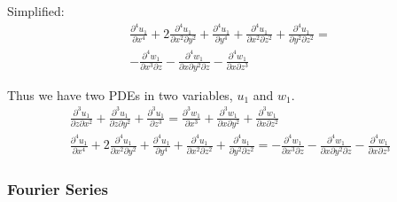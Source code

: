 \documentclass[12pt, a4paper, twoside, openright]{book}
\begin{document}
Simplified:
\begin{multline}
\frac{\partial^4 u_1}{\partial x^4} 
+ 2 \frac{\partial^4 u_1}{\partial x^2 \partial y^2} 
+ \frac{\partial^4 u_1}{\partial y^4}
+ \frac{\partial^4 u_1}{\partial x^2 \partial z^2} 
+ \frac{\partial^4 u_1}{\partial y^2 \partial z^2}
=  \\
- \frac{\partial^4 w_1}{\partial x^3 \partial z} 
- \frac{\partial^4 w_1}{\partial x \partial y^2 \partial z} 
- \frac{\partial^4 w_1}{\partial x \partial z^3} 
\end{multline}

Thus we have two PDEs in two variables, $u_1$ and $w_1$.
\begin{gather}
\frac{\partial^3 u_1}{\partial z \partial x^2} + \frac{\partial^3 u_1}{\partial z \partial y^2}
+ \frac{\partial^3 u_1}{\partial z^3} =
\frac{\partial^3 w_1}{\partial x^3} + \frac{\partial^3 w_1}{\partial x \partial y^2}
+ \frac{\partial^3 w_1}{\partial x \partial z^2} 
\\
\frac{\partial^4 u_1}{\partial x^4} 
+ 2 \frac{\partial^4 u_1}{\partial x^2 \partial y^2} 
+ \frac{\partial^4 u_1}{\partial y^4}
+ \frac{\partial^4 u_1}{\partial x^2 \partial z^2} 
+ \frac{\partial^4 u_1}{\partial y^2 \partial z^2}
=
- \frac{\partial^4 w_1}{\partial x^3 \partial z} 
- \frac{\partial^4 w_1}{\partial x \partial y^2 \partial z} 
- \frac{\partial^4 w_1}{\partial x \partial z^3} 
\end{gather}


\subsubsection{Fourier Series}
\end{document}
